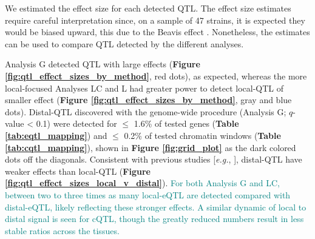 \documentclass[9pt,twocolumn,twoside]{gsajnl}
\newcommand{\eg}{\emph{e.g.}\xspace}
\newcommand{\WV}[2]{\textcolor{red}{#1\footnote{\textcolor{red}{WV: #2}}}}
\newcommand{\GKinline}[1]{\textcolor{teal}{#1}}
\begin{document}
We estimated the effect size for each detected QTL. The effect size estimates require careful interpretation since, on a sample of 47 strains, it is expected they would be biased upward, this due to the Beavis effect \citep{Keele2019}. Nonetheless, the estimates can be used to compare QTL detected by the different analyses.

Analysis G detected QTL with large effects (\textbf{Figure \ref{fig:qtl_effect_sizes_by_method}}, red dots), as expected, whereas the more local-focused Analyses LC and L had greater power to detect local-QTL of smaller effect (\textbf{Figure \ref{fig:qtl_effect_sizes_by_method}}, gray and blue dots). Distal-QTL discovered with the genome-wide procedure (Analysis G; $q$-value < 0.1) were detected for $\leq$ 1.6\% of tested genes (\textbf{Table \ref{tab:eqtl_mapping}}) and $\leq$ 0.2\% of tested chromatin windows (\textbf{Table \ref{tab:cqtl_mapping}}), shown in \textbf{Figure \ref{fig:grid_plot}} as the dark colored dots off the diagonals. Consistent with previous studies [\eg, \citet{Chick2016}], distal-QTL have weaker effects than local-QTL (\textbf{Figure \ref{fig:qtl_effect_sizes_local_v_distal}}).
\GKinline{For both Analysis G and LC, between two to three times as many local-eQTL are detected compared with
distal-eQTL, likely reflecting these stronger effects. A similar dynamic of local to distal signal is seen for cQTL, though the greatly reduced numbers result in less stable ratios across the tissues.}
\end{document}
